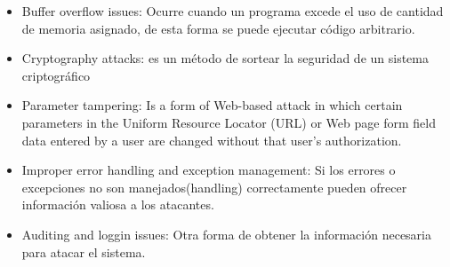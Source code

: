 \begin{enumerate}
\begin{enumerate}
\begin{itemize}
			\item Buffer overflow issues: Ocurre cuando un programa excede el uso de cantidad de memoria asignado, de esta forma se puede ejecutar código arbitrario.
			\item Cryptography attacks: es un método de sortear la seguridad de un sistema criptográfico
			\item Parameter tampering: Is a form of Web-based attack in which certain parameters in the Uniform Resource Locator (URL) or Web page form field data entered by a user are changed without that user's authorization.
			\item Improper error handling and exception management: Si los errores o excepciones no son manejados(handling) correctamente pueden ofrecer información valiosa a los atacantes.
			\item Auditing and loggin issues: Otra forma de obtener la información necesaria para atacar el sistema.
		\end{itemize}
	\end{enumerate}
\end{enumerate}


%
%	
